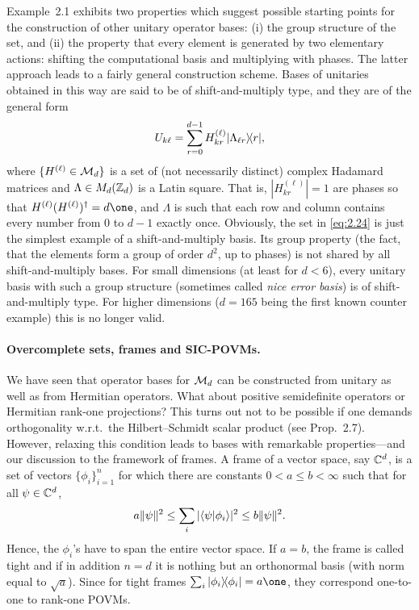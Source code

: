 \documentclass[11pt,a4paper]{article}
\numberwithin{equation}{section}
\theoremstyle{plain}
\theoremstyle{definition}
\begin{document}
Example~2.1 exhibits two properties which suggest possible starting points for the
construction of other unitary operator bases: (i) the group structure of the set,
and (ii) the property that every element is generated by two elementary actions:
shifting the computational basis and multiplying with phases. The latter approach
leads to a fairly general construction scheme. Bases of unitaries obtained in this
way are said to be of shift-and-multiply type, and they are of the general form
\begin{equation}\label{eq:2.28}
    U_{k\ell} = \sum_{r=0}^{d-1} H^{(\ell)}_{kr} |\Lambda_{\ell r}\rangle\!\langle r|,
\end{equation}
where $\{H^{(\ell)}\in \mathcal{M}_d\}$ is a set of (not necessarily distinct) complex
Hadamard matrices and $\Lambda \in M_d(\mathbb{Z}_d)$ is a Latin square. That is,
$|H^{(\ell)}_{kr}|=1$ are phases so that $H^{(\ell)}(H^{(\ell)})^\dagger=d\one$, and
$\Lambda$ is such that each row and column contains every number from $0$ to $d-1$
exactly once. Obviously, the set in \eqref{eq:2.24} is just the simplest example of a
shift-and-multiply basis. Its group property (the fact, that the elements form a group
of order $d^2$, up to phases) is not shared by all shift-and-multiply bases. For small
dimensions (at least for $d<6$), every unitary basis with such a group structure
(sometimes called \emph{nice error basis}) is of shift-and-multiply type. For higher
dimensions ($d=165$ being the first known counter example) this is no longer valid.

\paragraph{Overcomplete sets, frames and SIC-POVMs.}
We have seen that operator bases for $\mathcal{M}_d$ can be constructed from unitary as well
as from Hermitian operators. What about positive semidefinite operators or Hermitian
rank-one projections? This turns out not to be possible if one demands orthogonality
w.r.t.\ the Hilbert--Schmidt scalar product (see Prop.~2.7). However, relaxing this
condition leads to bases with remarkable properties---and our discussion to the
framework of frames. A frame of a vector space, say $\mathbb{C}^d$, is a set of vectors
$\{\phi_i\}_{i=1}^n$ for which there are constants $0<a\le b<\infty$ such that for all
$\psi\in \mathbb{C}^d$,
\begin{equation}\label{eq:2.29}
    a\|\psi\|^2 \le \sum_i |\langle\psi|\phi_i\rangle|^2 \le b\|\psi\|^2.
\end{equation}
Hence, the $\phi_i$'s have to span the entire vector space. If $a=b$, the frame is
called tight and if in addition $n=d$ it is nothing but an orthonormal basis (with
norm equal to $\sqrt{a}$). Since for tight frames $\sum_i \ketbra{\phi_i}{\phi_i} = a\one$,
they correspond one-to-one to rank-one POVMs.
\end{document}
